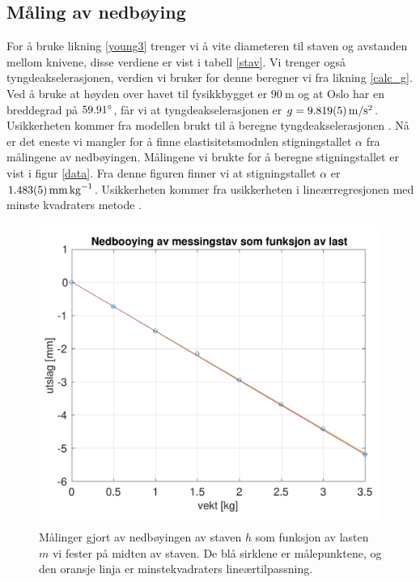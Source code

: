 \documentclass[%
 reprint,
 amsmath,amssymb,
 aps,
 norsk,
 booktabs
]{revtex4-1}
\begin{document}
\subsection{Måling av nedbøying}
For å bruke likning \eqref{young3} trenger vi å vite diameteren til staven og avstanden mellom knivene, disse verdiene er vist i tabell \vref{stav}. Vi trenger også tyngdeakselerasjonen, verdien vi bruker for denne beregner vi fra likning \eqref{calc_g}. Ved å bruke at høyden over havet til fysikkbygget er $\SI{90}{\meter}$ og at Oslo har en breddegrad på $59.91\degree$, får vi at tyngdeakselerasjonen er $g=\SI{9.819\pm0.005}{\meter\per\second^2}$. Usikkerheten kommer fra modellen brukt til å beregne tyngdeakselerasjonen \cite{gravity}.
Nå er det eneste vi mangler for å finne elastisitetsmodulen stigningstallet $\alpha$ fra målingene av nedbøyingen. Målingene vi brukte for å beregne stigningstallet er vist i figur \vref{data}. Fra denne figuren finner vi at stigningstallet $\alpha$ er $\SI{1.483\pm0.005}{\milli\meter\per\kilo\gram}$. Usikkerheten kommer fra usikkerheten i lineærregresjonen med minste kvadraters metode \cite{squires}.
\begin{figure}[h!]
  \centering
  \includegraphics[scale=0.46]{nedboojing_c.pdf}
  \caption{Målinger gjort av nedbøyingen av staven $h$ som funksjon av lasten $m$ vi fester på midten av staven. De blå sirklene er målepunktene, og den oransje linja er minstekvadraters lineærtilpassning.}
  \label{data}
\end{figure}
\end{document}
